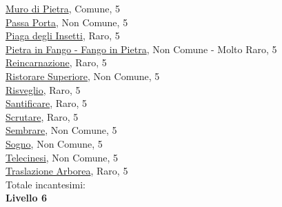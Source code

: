 \begin{multicols}{3}
{{\hyperlink{Muro di Pietra}{Muro di Pietra}, Comune, 5\\
\hyperlink{Passa Porta}{Passa Porta}, Non Comune, 5\\
\hyperlink{Piaga degli Insetti}{Piaga degli Insetti}, Raro, 5\\
\hyperlink{Pietra in Fango - Fango in Pietra}{Pietra in Fango - Fango in Pietra}, Non Comune - Molto Raro, 5\\
\hyperlink{Reincarnazione}{Reincarnazione}, Raro, 5\\
\hyperlink{Ristorare Superiore}{Ristorare Superiore}, Non Comune, 5\\
\hyperlink{Risveglio}{Risveglio}, Raro, 5\\
\hyperlink{Santificare}{Santificare}, Raro, 5\\
\hyperlink{Scrutare}{Scrutare}, Raro, 5\\
\hyperlink{Sembrare}{Sembrare}, Non Comune, 5\\
\hyperlink{Sogno}{Sogno}, Non Comune, 5\\
\hyperlink{Telecinesi}{Telecinesi}, Non Comune, 5\\
\hyperlink{Traslazione Arborea}{Traslazione Arborea}, Raro, 5\\

\medskip Totale incantesimi: \theinclvcinque\\

\textbf{Livello 6} 

}}
\end{multicols}
